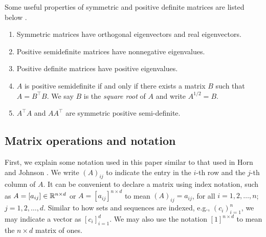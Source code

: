 Some useful properties of symmetric and positive definite matrices are listed below \cite{horn2013matrix}.

\begin{enumerate}
    \item Symmetric matrices have orthogonal eigenvectors and real eigenvectors.
    \item Positive semidefinite matrices have nonnegative eigenvalues.
    \item Positive definite matrices have positive eigenvalues.
    \item \(A\) is positive semidefinite if and only if there exists a matrix \(B\) such that \(A = B^\top B\). We say \(B\) is the \textit{square root} of \(A\) and write \(A^{1/2} = B\).
    \item \(A^\top A\) and \(AA^\top\) are symmetric positive semi-definite.
\end{enumerate}


\subsection{Matrix operations and notation}
\label{subsec:matrix-operations}

First, we explain some notation used in this paper similar to that used in Horn and Johnson \cite{horn2013matrix}.
We write \((A)_{ij}\) to indicate the entry in the \(i\)-th row and the \(j\)-th column of \(A\).
It can be convenient to declare a matrix using index notation, such as \(A = [a_{ij}] \in \mathbb{R}^{n \times d}\) or \(A = [a_{ij}]^{n \times d}\) to mean \((A)_{ij} = a_{ij}\), for all \(i=1,2,\dots,n\); \(j = 1,2,\dots,d\).
Similar to how sets and sequences are indexed, e.g., \((c_i)_{i=1}^n\), we may indicate a vector as \([c_i]_{i=1}^d\).
We may also use the notation \([1]^{n \times d}\) to mean the \(n \times d\) matrix of ones.

